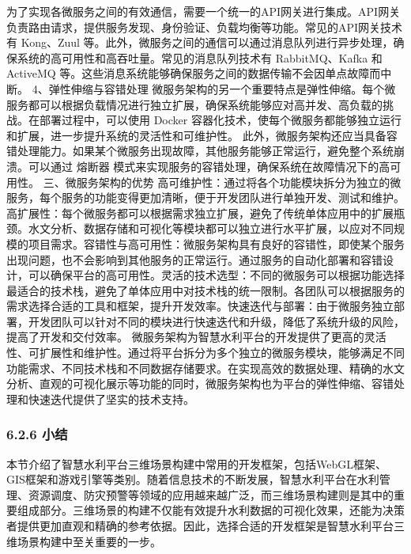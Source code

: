为了实现各微服务之间的有效通信，需要一个统一的API网关进行集成。API网关负责路由请求，提供服务发现、身份验证、负载均衡等功能。常见的API网关技术有 Kong、Zuul 等。此外，微服务之间的通信可以通过消息队列进行异步处理，确保系统的高可用性和高吞吐量。常见的消息队列技术有 RabbitMQ、Kafka 和 ActiveMQ 等。这些消息系统能够确保服务之间的数据传输不会因单点故障而中断。 4、弹性伸缩与容错处理 微服务架构的另一个重要特点是弹性伸缩。每个微服务都可以根据负载情况进行独立扩展，确保系统能够应对高并发、高负载的挑战。在部署过程中，可以使用 Docker 容器化技术，使每个微服务都能够独立运行和扩展，进一步提升系统的灵活性和可维护性。 此外，微服务架构还应当具备容错处理能力。如果某个微服务出现故障，其他服务能够正常运行，避免整个系统崩溃。可以通过 熔断器 模式来实现服务的容错处理，确保系统在故障情况下的高可用性。 三、微服务架构的优势 高可维护性：通过将各个功能模块拆分为独立的微服务，每个服务的功能变得更加清晰，便于开发团队进行单独开发、测试和维护。高扩展性：每个微服务都可以根据需求独立扩展，避免了传统单体应用中的扩展瓶颈。水文分析、数据存储和可视化等模块都可以独立进行水平扩展，以应对不同规模的项目需求。容错性与高可用性：微服务架构具有良好的容错性，即使某个服务出现问题，也不会影响到其他服务的正常运行。通过服务的自动化部署和容错设计，可以确保平台的高可用性。灵活的技术选型：不同的微服务可以根据功能选择最适合的技术栈，避免了单体应用中对技术栈的统一限制。各团队可以根据服务的需求选择合适的工具和框架，提升开发效率。快速迭代与部署：由于微服务独立部署，开发团队可以针对不同的模块进行快速迭代和升级，降低了系统升级的风险，提高了开发和交付效率。 微服务架构为智慧水利平台的开发提供了更高的灵活性、可扩展性和维护性。通过将平台拆分为多个独立的微服务模块，能够满足不同功能需求、不同技术栈和不同数据存储要求。在实现高效的数据处理、精确的水文分析、直观的可视化展示等功能的同时，微服务架构也为平台的弹性伸缩、容错处理和快速迭代提供了坚实的技术支持。 \subsubsection{6.2.6 小结}\label{ux5c0fux7ed3} 本节介绍了智慧水利平台三维场景构建中常用的开发框架，包括WebGL框架、GIS框架和游戏引擎等类别。随着信息技术的不断发展，智慧水利平台在水利管理、资源调度、防灾预警等领域的应用越来越广泛，而三维场景构建则是其中的重要组成部分。三维场景的构建不仅能有效提升水利数据的可视化效果，还能为决策者提供更加直观和精确的参考依据。因此，选择合适的开发框架是智慧水利平台三维场景构建中至关重要的一步。 